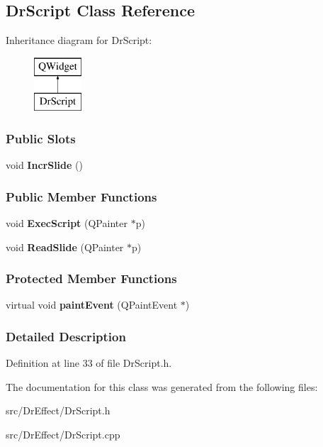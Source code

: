 \hypertarget{classDrScript}{}\subsection{Dr\+Script Class Reference}
\label{classDrScript}
Inheritance diagram for Dr\+Script\+:\begin{figure}[H]
\begin{center}
\leavevmode
\includegraphics[height=2.000000cm]{classDrScript}
\end{center}
\end{figure}
\subsubsection*{Public Slots}
\begin{DoxyCompactItemize}
\item 
void {\bfseries Incr\+Slide} ()\hypertarget{classDrScript_a70532654904bf37033660923eec20d03}{}\label{classDrScript_a70532654904bf37033660923eec20d03}

\end{DoxyCompactItemize}
\subsubsection*{Public Member Functions}
\begin{DoxyCompactItemize}
\item 
void {\bfseries Exec\+Script} (Q\+Painter $\ast$p)\hypertarget{classDrScript_ad07dfe5f66c1f4e18d5f02ad418db10e}{}\label{classDrScript_ad07dfe5f66c1f4e18d5f02ad418db10e}

\item 
void {\bfseries Read\+Slide} (Q\+Painter $\ast$p)\hypertarget{classDrScript_a4e36cec6c1334987ee4466ad67b9a959}{}\label{classDrScript_a4e36cec6c1334987ee4466ad67b9a959}

\end{DoxyCompactItemize}
\subsubsection*{Protected Member Functions}
\begin{DoxyCompactItemize}
\item 
virtual void {\bfseries paint\+Event} (Q\+Paint\+Event $\ast$)\hypertarget{classDrScript_ad06d035e601c42cc2a3b9d1229c73d36}{}\label{classDrScript_ad06d035e601c42cc2a3b9d1229c73d36}

\end{DoxyCompactItemize}


\subsubsection{Detailed Description}


Definition at line 33 of file Dr\+Script.\+h.



The documentation for this class was generated from the following files\+:\begin{DoxyCompactItemize}
\item 
src/\+Dr\+Effect/Dr\+Script.\+h\item 
src/\+Dr\+Effect/Dr\+Script.\+cpp\end{DoxyCompactItemize}
